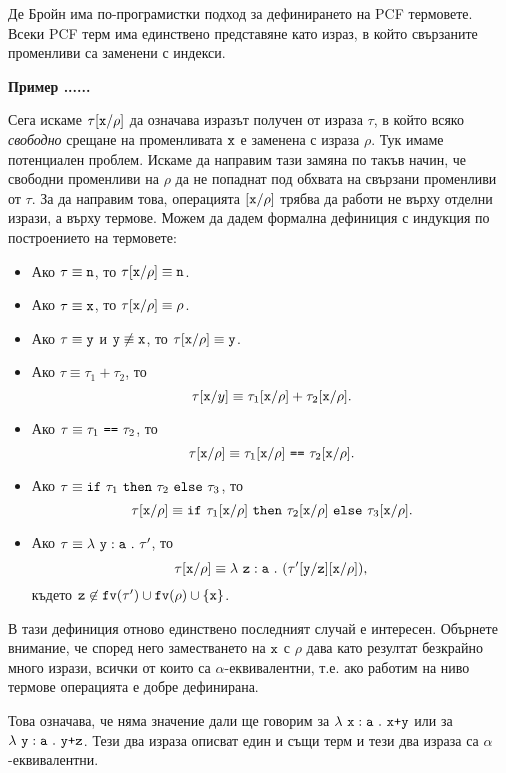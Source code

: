 Де Бройн има по-програмистки подход за дефинирането на PCF термовете.
Всеки PCF терм има единствено представяне като израз, в който свързаните променливи са заменени с индекси.

{\bf Пример ......}


Сега искаме $\tau[\texttt{x}/{\rho}]$ да означава изразът получен от израза $\tau$, в който всяко \emph{свободно} срещане на променливата $\texttt{x}$
е заменена с израза $\rho$. Тук имаме потенциален проблем. Искаме да направим тази замяна по такъв начин, че свободни променливи на $\rho$
да не попаднат под обхвата на свързани променливи от $\tau$. За да направим това, операцията $[\texttt{x}/{\rho}]$
трябва да работи не върху отделни изрази, а върху термове.
Можем да дадем формална дефиниция с индукция по построението на термовете:
\begin{itemize}
\item
  Ако $\tau \equiv \texttt{n}$, то $\tau[\texttt{x}/{\rho}] \equiv \texttt{n}$.
\item
  Ако $\tau \equiv \texttt{x}$, то $\tau[\texttt{x}/{\rho}] \equiv \rho$.
\item
  Ако $\tau \equiv \texttt{y}$ и $\texttt{y} \not\equiv \texttt{x}$, то $\tau[\texttt{x}/{\rho}] \equiv \texttt{y}$.
\item
  Ако $\tau \equiv \tau_1 + \tau_2$, то
  \[\tau[\texttt{x}/{y}] \equiv \tau_1[\texttt{x}/{\rho}] + \tau_2[\texttt{x}/{\rho}].\]
\item
  Ако $\tau \equiv \tau_1\ \vv{==}\ \tau_2$, то
  \[\tau\subst{x}{\rho} \equiv \tau_1\subst{x}{\rho}\ \vv{==}\ \tau_2\subst{x}{\rho}.\]
\item
  Ако $\tau \equiv \texttt{if}\ \tau_1\ \texttt{then}\ \tau_2\ \texttt{else}\ \tau_3$, то
  \[\tau[\texttt{x}/{\rho}] \equiv \texttt{if}\ \tau_1[\texttt{x}/{\rho}]\ \texttt{then}\ \tau_2[\texttt{x}/{\rho}]\ \texttt{else}\ \tau_3[\texttt{x}/{\rho}].\]
\item
  Ако $\tau \equiv \lambda~\texttt{y}:\texttt{a}~.~{\tau'}$, то
  \[\tau[\texttt{x}/{\rho}] \equiv \lambda~\texttt{z}:\texttt{a}~.~{(\tau'[\texttt{y}/{\texttt{z}}][\texttt{x}/{\rho}])},\]
  където $\texttt{z} \not\in \texttt{fv}(\tau') \cup \texttt{fv}(\rho) \cup \{\texttt{x}\}$.
\end{itemize}

В тази дефиниция отново единствено последният случай е интересен.
Обърнете внимание, че според него заместването на $\texttt{x}$ с $\rho$ дава като резултат безкрайно много
изрази, всички от които са $\alpha$-еквивалентни, т.е. ако работим на ниво термове операцията е добре дефинирана.

Това означава, че няма значение дали ще говорим за $\lambda~\texttt{x}:\texttt{a}~.~{\texttt{x+y}}$ или за $\lambda~\texttt{y}:\texttt{a}~.~{\texttt{y+z}}$.
Тези два израза описват един и същи терм и тези два израза са $\alpha$-еквивалентни.


